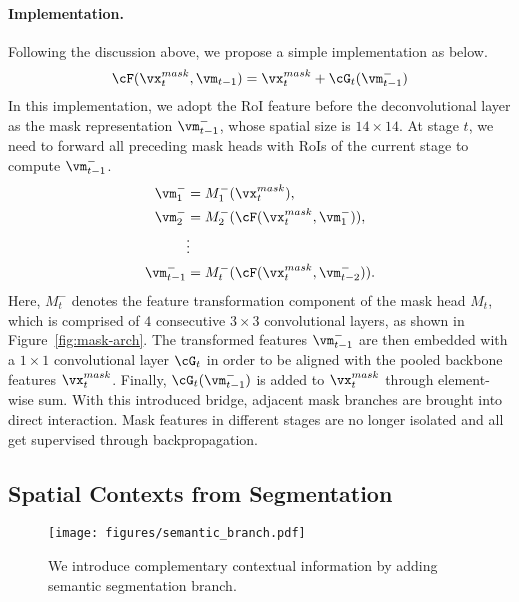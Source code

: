 \documentclass[10pt,twocolumn,letterpaper]{article}
\begin{document}
\vspace{-7pt}
\paragraph{Implementation.}
Following the discussion above, we propose a simple implementation
as below.
\begin{equation}
	\label{equ:bbox-feature}
	\cF(\vx_t^{mask},\vm_{t-1}) = \vx_t^{mask} + \cG_t(\vm^-_{t-1})
\end{equation}
In this implementation, we adopt the RoI feature before the deconvolutional
layer as the mask representation $\vm^-_{t-1}$, whose spatial size is $14\times14$.
At stage $t$, we need to forward all preceding mask heads with RoIs of the current stage to compute $\vm^-_{t-1}$.
\begin{equation}
	\label{equ:recursive-mask}
	\begin{split}
		\vm^-_1 &= M_1^-(\vx_t^{mask}), \\
		\vm^-_2 &= M_2^-(\cF(\vx_t^{mask},\vm^-_1)), \\
		&\vdots\\
		\vm^-_{t-1} &= M_t^-(\cF(\vx_t^{mask},\vm^-_{t-2})).
	\end{split}
\end{equation}
Here, $M_t^-$ denotes the feature transformation component of the
mask head $M_t$, which is comprised of $4$ consecutive $3\times3$ convolutional
layers, as shown in Figure~\ref{fig:mask-arch}.
The transformed features $\vm_{t-1}^-$ are then embedded with
a $1\times 1$ convolutional layer $\cG_t$ in order to be aligned with
the pooled backbone features $\vx_t^{mask}$.
Finally, $\cG_t(\vm_{t-1}^-)$ is added to $\vx_t^{mask}$ through element-wise
sum.
With this introduced bridge, adjacent mask branches are brought into direct
interaction. Mask features in different stages are no longer isolated and
all get supervised through backpropagation.


\subsection{Spatial Contexts from Segmentation}
\label{subsec:contexts}

\begin{figure}
	\centering
	\texttt{[image: figures/semantic\_branch.pdf]}
	\caption{We introduce complementary contextual information by adding semantic segmentation branch.}
	\label{fig:semantic-branch}
\end{figure}
\end{document}
